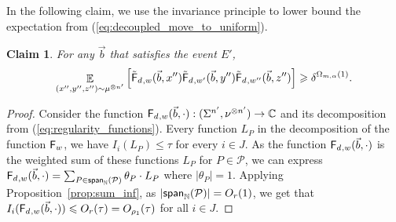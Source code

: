 \documentclass[10pt,a4paper]{amsart}
\newtheorem{claim}[thm]{Claim}
\newcommand\card[1]{\left| {#1} \right|}
\newcommand\Expect[2]{{\mathop{\mathbb{E}}_{#1}\left[ {#2} \right]}}
\newcommand\spn{{\sf span}_{\mathbb{N}}}
\renewcommand\geq{\geqslant}
\renewcommand\leq{\leqslant}
\newcommand{\V}[1]{{#1}}
\begin{document}
In the following claim, we use the invariance principle to lower bound the expectation from (\ref{eq:decoupled_move_to_uniform}).
\begin{claim}
\label{claim:invariance_lb}
  For any $\vec{b}$ that satisfies the event $E'$, 
$$\Expect{(\V x'', \V y'', \V z'')\sim\mu^{\otimes n'}}{\truncfcoarsedecoupled_{,\V w}(\vec{b}, \V x'')\truncfcoarsedecoupled_{,\V w'}(\vec{b}, \V y'') \truncfcoarsedecoupled_{,\V w''}(\vec{b}, \V z'')}\geq \delta^{\Omega_{m,\alpha}(1)}.$$
\end{claim}
\begin{proof}
   Consider the function $\fcoarsedecoupled_{,\V w}(\vec{b}, \cdot) : (\Sigma^{n'}, \nu^{\otimes n'}) \rightarrow \mathbb{C}$ and its decomposition from (\ref{eq:regularity_functions}). Every function $L_{P}$ in the decomposition of the function ${\mathsf{F}}_{w}$, we have $I_i(L_{P}) \leq \tau$ for every $i\in J$.  As the function $\fcoarsedecoupled_{,\V w}(\vec{b}, \cdot)$ is the weighted sum of these functions $L_{P}$ for $P\in \mathcal{P}$, we can express $\fcoarsedecoupled_{,\V w}(\vec{b}, \cdot) = \sum_{P\in \spn(\mathcal{P})} \theta_P \cdot L_P$ where $|\theta_P| = 1$. Applying Proposition~\ref{prop:sum_inf}, as $\card{\spn(\mathcal{P})} = O_r(1)$, we get that $I_i(\fcoarsedecoupled_{,\V w}(\vec{b},\cdot))\leq  O_{r}(\tau) = O_{\rho_1}(\tau)$ for all $i\in J$.
   


\end{proof}
\end{document}
